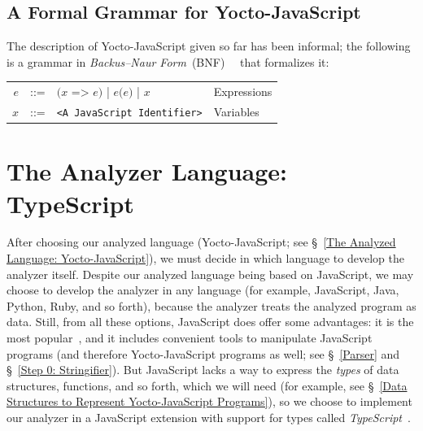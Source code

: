 \documentclass[12pt, oneside]{book}
\begin{document}
\begin{mdframed}[frametitle = {Advanced}]
\subsection{A Formal Grammar for Yocto-JavaScript}
\label{A Formal Grammar for Yocto-JavaScript}

The description of Yocto-JavaScript given so far has been informal; the following is a grammar in \emph{Backus–Naur Form}~(BNF)~\cite{bnf}~\cite[§~4.2]{dragon-book} that formalizes it:

\begin{center}
\begin{tabular}{rcll}
$e$ & ::= & $\texttt{(}x\texttt{ => }e\texttt{)}$ | $e\texttt{(}e\texttt{)}$ | $x$ & Expressions \\
$x$ & ::= & \texttt{<A JavaScript Identifier>} & Variables \\
\end{tabular}
\end{center}

\end{mdframed}

\section{The Analyzer Language: TypeScript}
\label{The Analyzer Language: TypeScript}

After choosing our analyzed language (Yocto-JavaScript; see §~\ref{The Analyzed Language: Yocto-JavaScript}), we must decide in which language to develop the analyzer itself. Despite our analyzed language being based on JavaScript, we may choose to develop the analyzer in any language (for example, JavaScript, Java, Python, Ruby, and so forth), because the analyzer treats the analyzed program as data. Still, from all these options, JavaScript does offer some advantages: it is the most popular~\cite{stack-overflow-developer-survey, jet-brains-developer-survey}, and it includes convenient tools to manipulate JavaScript programs (and therefore Yocto-JavaScript programs as well; see §~\ref{Parser} and §~\ref{Step 0: Stringifier}). But JavaScript lacks a way to express the \emph{types} of data structures, functions, and so forth, which we will need (for example, see §~\ref{Data Structures to Represent Yocto-JavaScript Programs}), so we choose to implement our analyzer in a JavaScript extension with support for types called \emph{TypeScript}~\cite{typescript-documentation, typescript-deep-dive, understanding-typescript}.
\end{document}

